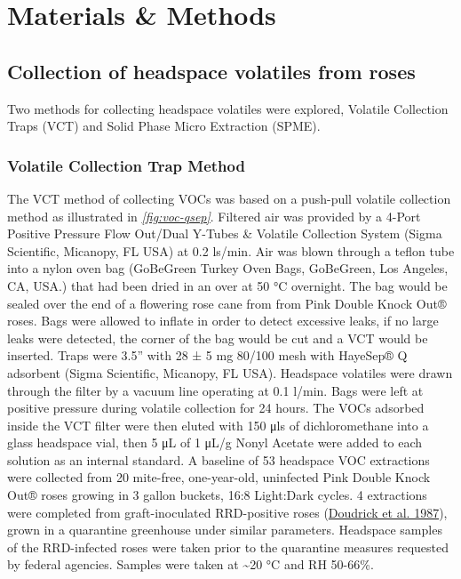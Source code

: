 \documentclass[12pt,final,CPage]{ufthesis}
\begin{document}
{  \hypertarget{mm-vocs-olfact}{%
  \section{Materials \& Methods}\label{mm-vocs-olfact}}

  \hypertarget{mm-vocs}{%
  \subsection{Collection of headspace volatiles from roses}\label{mm-vocs}}

  Two methods for collecting headspace volatiles were explored, Volatile Collection Traps (VCT) and Solid Phase Micro Extraction (SPME).

  \hypertarget{mm-vct}{%
  \subsubsection{Volatile Collection Trap Method}\label{mm-vct}}

  The VCT method of collecting VOCs was based on a push-pull volatile collection method as illustrated in \emph{\ref{fig:voc-qsep}}. Filtered air was provided by a 4-Port Positive Pressure Flow Out/Dual Y-Tubes \& Volatile Collection System (Sigma Scientific, Micanopy, FL USA) at 0.2 \si{\litre}s/min. Air was blown through a teflon tube into a nylon oven bag (GoBeGreen Turkey Oven Bags, GoBeGreen, Los Angeles, CA, USA.) that had been dried in an over at 50 °C overnight. The bag would be sealed over the end of a flowering rose cane from from Pink Double Knock Out® roses. Bags were allowed to inflate in order to detect excessive leaks, if no large leaks were detected, the corner of the bag would be cut and a VCT would be inserted. Traps were 3.5'' with 28 ± 5 \si{\milli\gram} 80/100 mesh with HayeSep® Q adsorbent (Sigma Scientific, Micanopy, FL USA). Headspace volatiles were drawn through the filter by a vacuum line operating at 0.1 \si{\litre}/min. Bags were left at positive pressure during volatile collection for 24 hours. The VOCs adsorbed inside the VCT filter were then eluted with 150 \si{\micro\litre}s of dichloromethane into a glass headspace vial, then 5 \si{\micro\liter} of 1 \si{\micro\liter}/\si{\gram} Nonyl Acetate were added to each solution as an internal standard. A baseline of 53 headspace VOC extractions were collected from 20 mite-free, one-year-old, uninfected Pink Double Knock Out® roses growing in 3 gallon buckets, 16:8 Light:Dark cycles. 4 extractions were completed from graft-inoculated RRD-positive roses (\protect\hyperlink{ref-Doudrick1987}{Doudrick et al. 1987}), grown in a quarantine greenhouse under similar parameters. Headspace samples of the RRD-infected roses were taken prior to the quarantine measures requested by federal agencies. Samples were taken at \textasciitilde20 °C and RH 50-66\%.

}
\end{document}
